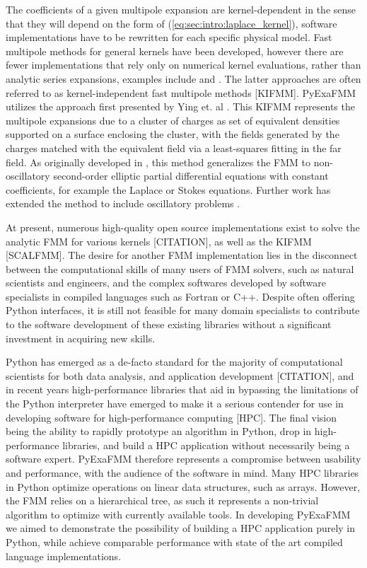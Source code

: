 \documentclass{IEEEcsmag}
\begin{document}
The coefficients of a given multipole expansion are kernel-dependent in the sense that they will depend on the form of (\ref{eq:sec:intro:laplace_kernel}), software implementations have to be rewritten for each specific physical model. Fast multipole methods for general kernels \cite{Gimbutas2003} have been developed, however there are fewer implementations that rely only on numerical kernel evaluations, rather than analytic series expansions, examples include \cite{Fong2009} and \cite{Ying2004}. The latter approaches are often referred to as kernel-independent fast multipole methods [KIFMM]. PyExaFMM utilizes the approach first presented by Ying et. al \cite{Ying2004}. This KIFMM represents the multipole expansions due to a cluster of charges as set of equivalent densities supported on a surface enclosing the cluster, with the fields generated by the charges matched with the equivalent field via a least-squares fitting in the far field. As originally developed in \cite{Ying2004}, this method generalizes the FMM to non-oscillatory second-order elliptic partial differential equations with constant coefficients, for example the Laplace or Stokes equations. Further work has extended the method to include oscillatory problems \cite{Engquist2007}.

At present, numerous high-quality open source implementations exist to solve the analytic FMM for various kernels [CITATION], as well as the KIFMM \cite{Wang2021} [SCALFMM].
The desire for another FMM implementation lies in the disconnect between the computational skills of many users of FMM solvers, such as natural scientists and engineers, and the complex softwares developed by software specialists in compiled languages such as Fortran or C++. Despite often offering Python interfaces, it is still not feasible for many domain specialists to contribute to the software development of these existing libraries without a significant investment in acquiring new skills.

Python has emerged as a de-facto standard for the majority of computational scientists for both data analysis, and application development [CITATION], and in recent years high-performance libraries that aid in bypassing the limitations of the Python interpreter have emerged to make it a serious contender for use in developing software for high-performance computing [HPC]. The final vision being the ability to rapidly prototype an algorithm in Python, drop in high-performance libraries, and build a HPC application without necessarily being a software expert. PyExaFMM therefore represents a compromise between usability and performance, with the audience of the software in mind. Many HPC libraries in Python optimize operations on linear data structures, such as arrays. However, the FMM relies on a hierarchical tree, as such it represents a non-trivial algorithm to optimize with currently available tools. In developing PyExaFMM we aimed to demonstrate the possibility of building a HPC application purely in Python, while achieve comparable performance with state of the art compiled language implementations.
\end{document}
